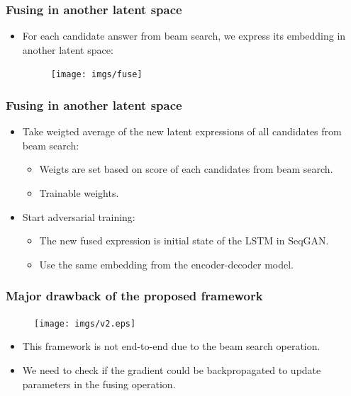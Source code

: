 \documentclass{beamer}
\begin{document}
\begin{frame}
\frametitle{Fusing in another latent space}
\begin{itemize}
\item For each candidate answer from beam search, we express its embedding in another latent space:
  \begin{figure}
      \centering
      \hspace{-1cm}\texttt{[image: imgs/fuse]}
  \end{figure}
\end{itemize}
\end{frame}

\begin{frame}
\frametitle{Fusing in another latent space}
\begin{itemize}
\item Take weigted average of the new latent expressions of all candidates from beam search:
      \begin{itemize}
      \item Weigts are set based on score of each candidates from beam search.
      \item Trainable weights.
      \end{itemize}
      \vspace{.4cm}
\item Start adversarial training:
      \begin{itemize}
      \item The new fused expression is initial state of the LSTM in SeqGAN.
      \item Use the same embedding from the encoder-decoder model.
      \end{itemize}
\end{itemize}
\end{frame}

\begin{frame}
\frametitle{Major drawback of the proposed framework}
\begin{figure}
\centering
\texttt{[image: imgs/v2.eps]}
\end{figure}
\begin{itemize}
\item This framework is not end-to-end due to the beam search operation.
\item We need to check if the gradient could be backpropagated to update parameters in the fusing operation. 
\end{itemize}
\end{frame}
\end{document}
